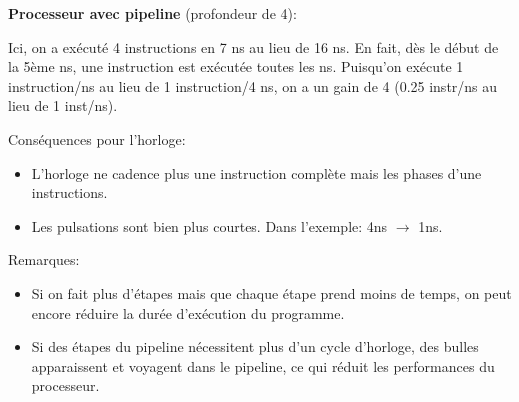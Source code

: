 \documentclass[a4paper]{article}
\begin{document}
\textbf{Processeur avec pipeline} (profondeur de 4):
\begin{center}
\end{center}

\begin{example}
Ici, on a exécuté 4 instructions en 7 ns au lieu de 16 ns. En fait, dès le début de la 5ème ns, une instruction est exécutée toutes les ns. Puisqu'on exécute 1 instruction/ns au lieu de 1 instruction/4 ns, on a un gain de 4 (0.25 instr/ns au lieu de 1 inst/ns).
\end{example}

Conséquences pour l'horloge:
\begin{itemize}
    \item L’horloge ne cadence plus une instruction complète mais les phases d’une instructions.
    \item Les pulsations sont bien plus courtes. Dans l’exemple: 4ns $ \rightarrow $ 1ns.
\end{itemize}

Remarques:
\begin{itemize}
    \item Si on fait plus d'étapes mais que chaque étape prend moins de temps, on peut encore réduire la durée d'exécution du programme.
    \item Si des étapes du pipeline nécessitent plus d'un cycle d'horloge, des bulles apparaissent et voyagent dans le pipeline, ce qui réduit les performances du processeur.
\end{itemize}
\end{document}
